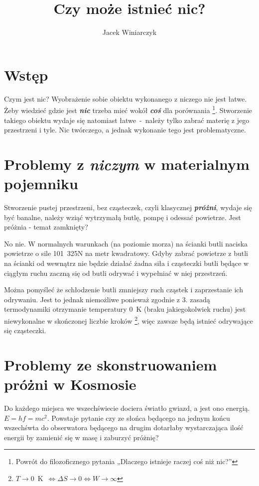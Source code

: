 \documentclass{article}
\author{Jacek Winiarczyk}
\date{}
\title{\Huge\textbf{Czy może istnieć nic?}}
\begin{document}
\maketitle

\section{Wstęp}
Czym jest nic? Wyobrażenie sobie obiektu wykonanego z niczego nie jest łatwe.
Żeby wiedzieć gdzie jest \textbf{\textit{nic}} trzeba mieć wokół \textbf{\textit{coś}} dla porównania
\footnote{Powrót do filozoficznego pytania „Dlaczego istnieje raczej coś niż nic?”}.
Stworzenie takiego obiektu wydaje się natomiast łatwe~-~należy tylko zabrać materię z jego przestrzeni i tyle.
Nic twórczego, a jednak wykonanie tego jest problematyczne.

\section{Problemy z \textit{niczym} w materialnym pojemniku}
Stworzenie pustej przestrzeni, bez cząsteczek, czyli klasycznej \textbf{\textit{próżni}},
wydaje się być banalne, należy wziąć wytrzymałą butlę,
pompę i odessać powietrze. Jest próżnia - temat zamknięty?

No nie. W normalnych warunkach (na poziomie morza) na ścianki butli naciska powietrze o sile 101~325N na metr kwadratowy.
Gdyby zabrać powietrze z butli na ścianki od wewnątrz nie będzie działać żadna siła i
cząsteczki butli będące w ciągłym ruchu zaczną się od butli odrywać i wypełniać w niej przestrzeń.

Można pomyśleć że schłodzenie butli zmniejszy ruch cząstek i zaprzestanie ich odrywaniu.
Jest to jednak niemożliwe ponieważ zgodnie z 3. zasadą termodynamiki otrzymanie temperatury 0~K
(braku jakiegokolwiek ruchu) jest niewykonalne w skończonej liczbie kroków
\footnote{$T\to 0$~K~$\Longleftrightarrow\Delta S \to 0\Longleftrightarrow W \to \infty$},
więc zawsze będą istnieć odrywające się cząsteczki.

\section{Problemy ze skonstruowaniem próżni w Kosmosie}
Do każdego miejsca we wszechświecie dociera światło gwiazd, a jest ono energią. $E=hf=mc^2$.
Powstaje pytanie czy ze słońca będącego na jednym końcu wszechśwta do obserwatora będącego na drugim dotarłaby wystarczająca ilość energii by zamienić się w masę i zaburzyć próżnię?
\end{document}
